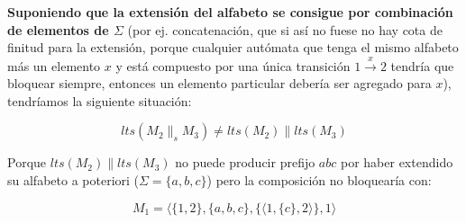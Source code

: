 \textbf{Suponiendo que la extensión del alfabeto se consigue por combinación de elementos de $\Sigma$} (por ej. concatenación, que si así no fuese no hay cota de finitud para la extensión, porque cualquier autómata que tenga el mismo alfabeto más un elemento $x$ y está compuesto por una única transición $1 \xrightarrow{x} 2$ tendría que bloquear siempre, entonces un elemento particular debería ser agregado para $x$), tendríamos la siguiente situación:

\[lts(M_2 \parallel_s M_3) \neq lts(M_2)\parallel lts(M_3)\]

Porque $lts(M_2)\parallel lts(M_3)$ no puede producir prefijo $abc$ por haber extendido su alfabeto a poteriori ($\Sigma = \lbrace a,b,c \rbrace$)
pero la composición no bloquearía con:

\[M_1 = \langle \lbrace 1,2 \rbrace, \lbrace a,b,c \rbrace, \lbrace\langle 1, \lbrace c \rbrace, 2 \rangle\rbrace, 1 \rangle\]